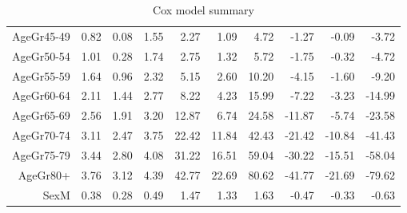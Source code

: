 \begin{table}[ht]
\begin{tabular}{rrrrrrrrrr}
  AgeGr45-49 & 0.82 & 0.08 & 1.55 & 2.27 & 1.09 & 4.72 & -1.27 & -0.09 & -3.72 \\ 
  AgeGr50-54 & 1.01 & 0.28 & 1.74 & 2.75 & 1.32 & 5.72 & -1.75 & -0.32 & -4.72 \\ 
  AgeGr55-59 & 1.64 & 0.96 & 2.32 & 5.15 & 2.60 & 10.20 & -4.15 & -1.60 & -9.20 \\ 
  AgeGr60-64 & 2.11 & 1.44 & 2.77 & 8.22 & 4.23 & 15.99 & -7.22 & -3.23 & -14.99 \\ 
  AgeGr65-69 & 2.56 & 1.91 & 3.20 & 12.87 & 6.74 & 24.58 & -11.87 & -5.74 & -23.58 \\ 
  AgeGr70-74 & 3.11 & 2.47 & 3.75 & 22.42 & 11.84 & 42.43 & -21.42 & -10.84 & -41.43 \\ 
  AgeGr75-79 & 3.44 & 2.80 & 4.08 & 31.22 & 16.51 & 59.04 & -30.22 & -15.51 & -58.04 \\ 
  AgeGr80+ & 3.76 & 3.12 & 4.39 & 42.77 & 22.69 & 80.62 & -41.77 & -21.69 & -79.62 \\ 
  SexM & 0.38 & 0.28 & 0.49 & 1.47 & 1.33 & 1.63 & -0.47 & -0.33 & -0.63 \\ 
   \hline
\end{tabular}
\caption{Cox model summary} 
\end{table}
